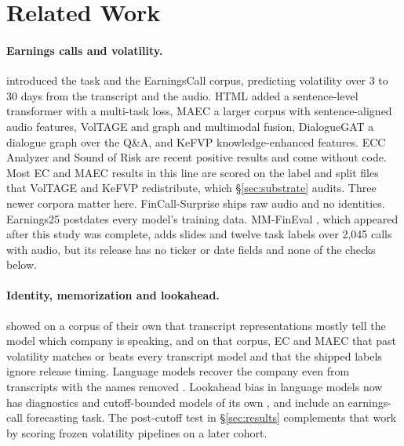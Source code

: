 \section{Related Work}
\label{sec:related}

\paragraph{Earnings calls and volatility.}
\citet{qin2019what} introduced the task and the EarningsCall corpus, predicting
volatility over 3 to 30 days from the transcript and the audio. HTML
\citep{yang2020html} added a sentence-level transformer with a multi-task loss,
MAEC \citep{li2020maec} a larger corpus with sentence-aligned audio features,
VolTAGE \citep{sawhney2020voltage} and \citet{sawhney2020mm} graph and multimodal
fusion, DialogueGAT \citep{sang2022dialoguegat} a dialogue graph over the Q\&A,
and KeFVP \citep{niu2023kefvp} knowledge-enhanced features. ECC Analyzer
\citep{cao2024ecc} and Sound of Risk \citep{soundofrisk2025} are recent positive
results and come without code. Most EC and MAEC results in this line are scored
on the label and split files that VolTAGE and KeFVP redistribute, which
\S\ref{sec:substrate} audits. Three newer corpora matter here. FinCall-Surprise
\citep{fincall2025} ships raw audio and no identities. Earnings25
\citep{jiang2026earnings25} postdates every model's training data. MM-FinEval
\citep{mmfineval2026}, which appeared after this study was complete, adds slides
and twelve task labels over 2{,}045 calls with audio, but its release has no
ticker or date fields and none of the checks below.

\paragraph{Identity, memorization and lookahead.}
\citet{scss2024} showed on a corpus of their own that transcript
representations mostly tell the model which company is speaking, and on that
corpus, EC and MAEC that past volatility matches or beats every transcript
model and that the shipped labels ignore release timing. Language models recover the company even
from transcripts with the names removed \citep{memorization2025}. Lookahead bias
in language models now has diagnostics and cutoff-bounded models of its own
\citep{lookahead2025,datedgpt2026,lookaheadbench2026}, and \citet{lookahead2025}
include an earnings-call forecasting task. The post-cutoff test in
\S\ref{sec:results} complements that work by scoring frozen volatility
pipelines on a later cohort.

